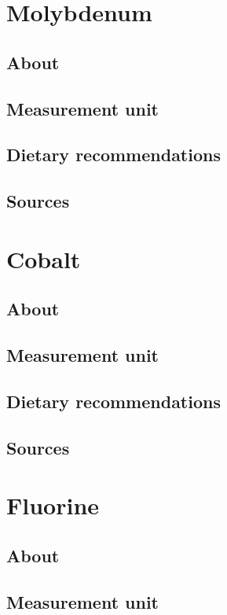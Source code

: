 \documentclass{book}
\begin{document}
\chapter{Molybdenum}
\section{About}


\section{Measurement unit}


\section{Dietary recommendations}


\section{Sources}


\chapter{Cobalt}
\section{About}


\section{Measurement unit}


\section{Dietary recommendations}


\section{Sources}


\chapter{Fluorine}
\section{About}


\section{Measurement unit}
\end{document}
